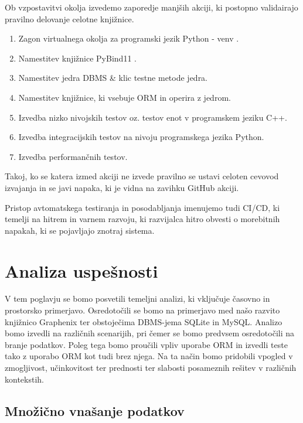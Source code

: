 \documentclass[a4paper,12pt,openright]{book}
\begin{document}
   Ob vzpostavitvi okolja izvedemo zaporedje manjših akciji, ki postopno validairajo pravilno delovanje celotne knjižnice.
   \begin{enumerate}
       \item Zagon virtualnega okolja za programski jezik Python - venv \cite{PY_VENV_DOCS}.
       \item Namestitev knjižnice PyBind11 \cite{PYBIND11_GITHUB}.
       \item Namestitev jedra DBMS \& klic testne metode jedra.
       \item Namestitev knjižnice, ki vsebuje ORM in operira z jedrom.
       \item Izvedba nizko nivojskih testov oz. testov enot v programskem jeziku C++.
       \item Izvedba integracijskih testov na nivoju programskega jezika Python.
       \item Izvedba performančnih testov.
   \end{enumerate}

    \noindent
   Takoj, ko se katera izmed akciji ne izvede pravilno se ustavi celoten cevovod izvajanja in se javi napaka, ki je vidna na zavihku GitHub akciji.

   Pristop avtomatskega testiranja in posodabljanja imenujemo tudi CI/CD, ki temelji na hitrem in varnem razvoju, ki razvijalca hitro obvesti o morebitnih napakah, ki se pojavljajo znotraj sistema.
    
\chapter{Analiza uspešnosti}
\label{ch2}

    V tem poglavju se bomo posvetili temeljni analizi, ki vključuje časovno in prostorsko primerjavo. Osredotočili se bomo na primerjavo med našo razvito knjižnico Graphenix ter obstoječima DBMS-jema SQLite in MySQL. Analizo bomo izvedli na različnih scenarijih, pri čemer se bomo predvsem osredotočili na branje podatkov. Poleg tega bomo proučili vpliv uporabe ORM in izvedli teste tako z uporabo ORM kot tudi brez njega. Na ta način bomo pridobili vpogled v zmogljivost, učinkovitost ter prednosti ter slabosti posameznih rešitev v različnih kontekstih.

    \newpage
   \section{Množično vnašanje podatkov}
\end{document}
